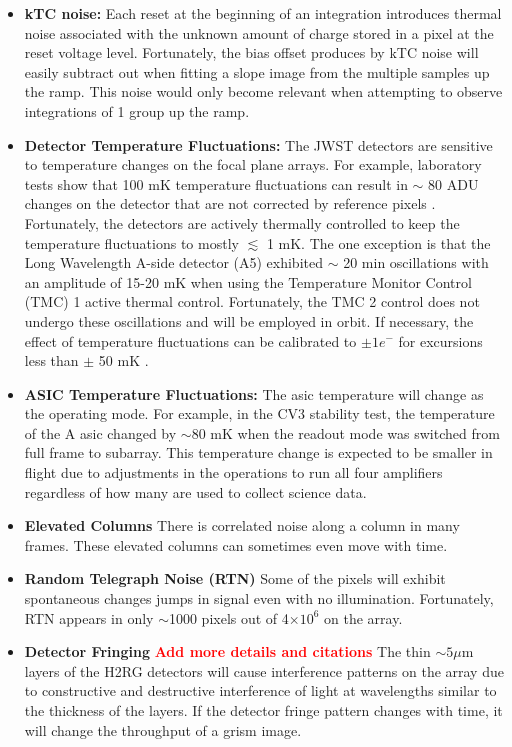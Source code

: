 \documentclass{aastex62}
\begin{document}
\begin{itemize}[noitemsep]
	\item \textbf{kTC noise:} Each reset at the beginning of an integration introduces thermal noise associated with the unknown amount of charge stored in a pixel at the reset voltage level.
	Fortunately, the bias offset produces by kTC noise will easily subtract out when fitting a slope image from the multiple samples up the ramp.
	This noise would  only become relevant when attempting to observe integrations of 1 group up the ramp.
	\item \textbf{Detector Temperature Fluctuations:} The JWST detectors are sensitive to temperature changes on the focal plane arrays. For example, laboratory tests show that 100 mK temperature fluctuations can result in $\sim$ 80 ADU changes on the detector that are not corrected by reference pixels \citep{hall2005jwstArrays}. Fortunately, the detectors are actively thermally controlled to keep the temperature fluctuations to mostly $\lesssim$ 1 mK.
The one exception is that the Long Wavelength A-side detector (A5) exhibited $\sim$ 20 min oscillations with an amplitude of 15-20 mK when using the Temperature Monitor Control (TMC) 1 active thermal control.
Fortunately, the TMC 2 control does not undergo these oscillations and will be employed in orbit.
If necessary, the effect of temperature fluctuations can be calibrated to $\pm 1 e^-$ for excursions less than $\pm$ 50 mK \citep{hall2005jwstArrays}.
	\item \textbf{ASIC Temperature Fluctuations:} The asic temperature will change as the operating mode. For example, in the CV3 stability test, the temperature of the A asic changed by $\sim$80 mK when the readout mode was switched from full frame to subarray.
	This temperature change is expected to be smaller in flight due to adjustments in the operations to run all four amplifiers regardless of how many are used to collect science data.
	\item \textbf{Elevated Columns} There is correlated noise along a column in many frames. These elevated columns can sometimes even move with time.
	\item \textbf{Random Telegraph Noise (RTN)} Some of the pixels will exhibit spontaneous changes jumps in signal even with no illumination. Fortunately, RTN appears in only $\sim$1000 pixels out of 4$\times 10^6$ on the array.
	\item \textbf{Detector Fringing} \textbf{\textcolor{red}{Add more details and citations}} The thin $\sim 5\mu$m layers of the H2RG detectors will cause interference patterns on the array due to constructive and destructive interference of light at wavelengths similar to the thickness of the layers. If the detector fringe pattern changes with time, it will change the throughput of a grism image.

\end{itemize}
\end{document}
